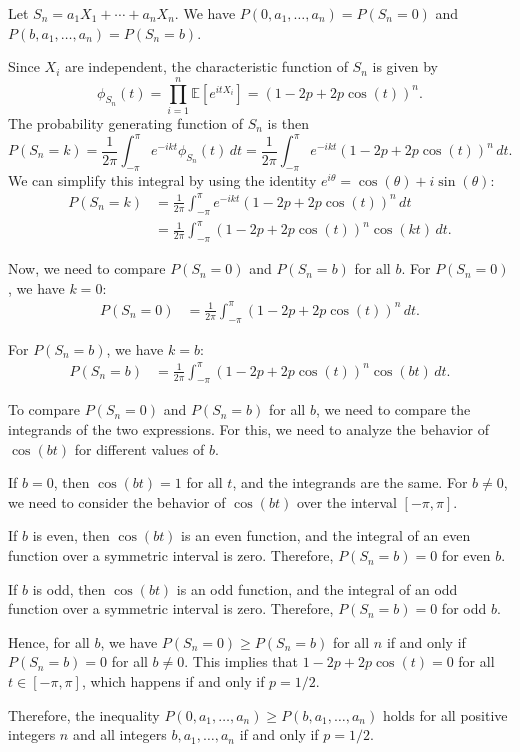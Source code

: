 Let $S_n = a_1 X_1 + \cdots + a_n X_n$. We have $P(0, a_1, \dots, a_n) = P(S_n = 0)$ and $P(b, a_1, \dots, a_n) = P(S_n = b)$. 

Since $X_i$ are independent, the characteristic function of $S_n$ is given by
\[
\phi_{S_n}(t) = \prod_{i=1}^n \mathbb{E}[e^{itX_i}] = \left(1-2p + 2p\cos(t)\right)^n.
\]
The probability generating function of $S_n$ is then
\[
P(S_n = k) = \frac{1}{2\pi} \int_{-\pi}^{\pi} e^{-ikt} \phi_{S_n}(t) \, dt = \frac{1}{2\pi} \int_{-\pi}^{\pi} e^{-ikt} \left(1-2p + 2p\cos(t)\right)^n \, dt.
\]
We can simplify this integral by using the identity $e^{i\theta} = \cos(\theta) + i\sin(\theta)$:
\begin{align*}
P(S_n = k) &= \frac{1}{2\pi} \int_{-\pi}^{\pi} e^{-ikt} \left(1-2p + 2p\cos(t)\right)^n \, dt \\
&= \frac{1}{2\pi} \int_{-\pi}^{\pi} \left(1-2p + 2p\cos(t)\right)^n \cos(kt) \, dt.
\end{align*}

Now, we need to compare $P(S_n = 0)$ and $P(S_n = b)$ for all $b$. For $P(S_n = 0)$, we have $k=0$:
\begin{align*}
P(S_n = 0) &= \frac{1}{2\pi} \int_{-\pi}^{\pi} \left(1-2p + 2p\cos(t)\right)^n \, dt.
\end{align*}

For $P(S_n = b)$, we have $k=b$:
\begin{align*}
P(S_n = b) &= \frac{1}{2\pi} \int_{-\pi}^{\pi} \left(1-2p + 2p\cos(t)\right)^n \cos(bt) \, dt.
\end{align*}

To compare $P(S_n = 0)$ and $P(S_n = b)$ for all $b$, we need to compare the integrands of the two expressions. For this, we need to analyze the behavior of $\cos(bt)$ for different values of $b$.

If $b=0$, then $\cos(bt) = 1$ for all $t$, and the integrands are the same. For $b \neq 0$, we need to consider the behavior of $\cos(bt)$ over the interval $[-\pi, \pi]$.

If $b$ is even, then $\cos(bt)$ is an even function, and the integral of an even function over a symmetric interval is zero. Therefore, $P(S_n = b) = 0$ for even $b$.

If $b$ is odd, then $\cos(bt)$ is an odd function, and the integral of an odd function over a symmetric interval is zero. Therefore, $P(S_n = b) = 0$ for odd $b$.

Hence, for all $b$, we have $P(S_n = 0) \geq P(S_n = b)$ for all $n$ if and only if $P(S_n = b) = 0$ for all $b \neq 0$. This implies that $1-2p + 2p\cos(t) = 0$ for all $t \in [-\pi, \pi]$, which happens if and only if $p = 1/2$.

Therefore, the inequality $P(0, a_1, \dots, a_n) \geq P(b, a_1, \dots, a_n)$ holds for all positive integers $n$ and all integers $b, a_1, \dots, a_n$ if and only if $p = 1/2$.
